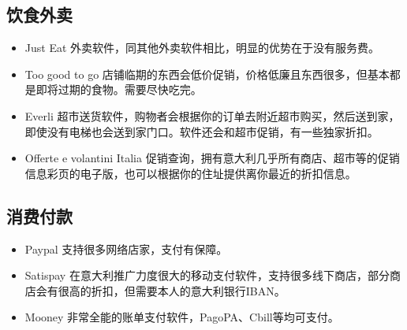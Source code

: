 \subsection{饮食外卖}
\begin{itemize}
\item Just Eat        外卖软件，同其他外卖软件相比，明显的优势在于没有服务费。
\item Too good to go  店铺临期的东西会低价促销，价格低廉且东西很多，但基本都是即将过期的食物。需要尽快吃完。
\item Everli          超市送货软件，购物者会根据你的订单去附近超市购买，然后送到家，即使没有电梯也会送到家门口。软件还会和超市促销，有一些独家折扣。
\item Offerte e volantini Italia  促销查询，拥有意大利几乎所有商店、超市等的促销信息彩页的电子版，也可以根据你的住址提供离你最近的折扣信息。
\end{itemize}

\subsection{消费付款}
\begin{itemize}
\item Paypal    支持很多网络店家，支付有保障。
\item Satispay  在意大利推广力度很大的移动支付软件，支持很多线下商店，部分商店会有很高的折扣，但需要本人的意大利银行IBAN。
\item Mooney    非常全能的账单支付软件，PagoPA、Cbill等均可支付。
\end{itemize}



